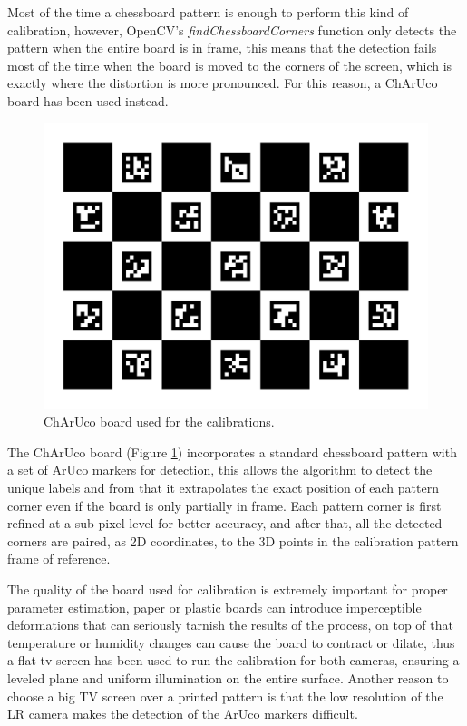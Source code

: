 Most of the time a chessboard pattern is enough to perform this kind of calibration, however, OpenCV's \emph{findChessboardCorners} function only detects the pattern when the entire board is in frame, this means that the detection fails most of the time when the board is moved to the corners of the screen, which is exactly where the distortion is more pronounced. For this reason, a ChArUco board has been used instead.

\begin{figure}[h]
  \centering
  \includegraphics[scale=0.15]{figures/charucoboard.png}
  \caption{ChArUco board used for the calibrations.}
  \label{img:ch_board}
\end{figure}

The ChArUco board (Figure \ref{img:ch_board}) incorporates a standard chessboard pattern with a set of ArUco markers for detection, this allows the algorithm to detect the unique labels and from that it extrapolates the exact position of each pattern corner even if the board is only partially in frame. Each pattern corner is first refined at a sub-pixel level for better accuracy, and after that, all the detected corners are paired, as 2D coordinates, to the 3D points in the calibration pattern frame of reference.

The quality of the board used for calibration is extremely important for proper parameter estimation, paper or plastic boards can introduce imperceptible deformations that can seriously tarnish the results of the process, on top of that temperature or humidity changes can cause the board to contract or dilate, thus a flat tv screen has been used to run the calibration for both cameras, ensuring a leveled plane and uniform illumination on the entire surface. Another reason to choose a big TV screen over a printed pattern is that the low resolution of the LR camera makes the detection of the ArUco markers difficult.

